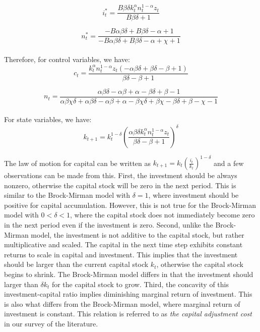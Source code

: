 \documentclass{article}
\begin{document}
\begin{equation}
    i_t^* = \frac{B\beta\delta k_t^\alpha n_t^{1 - \alpha}z_t}{B\beta\delta + 1}
\end{equation}

\begin{equation}
    n_t^* = \frac{-B\alpha\beta\delta + B\beta\delta - \alpha + 1}{-B\alpha\beta\delta + B\beta\delta - \alpha + \chi + 1}
\end{equation}\\

Therefore, for control variables, we have:\\
\begin{equation}
    c_t = \frac{k_t^\alpha n_t^{1-\alpha} z_t (-\alpha\beta\delta + \beta\delta - \beta + 1)}{\beta\delta - \beta + 1}
\end{equation}

\begin{equation}
    n_t = \frac{\alpha\beta\delta - \alpha\beta + \alpha - \beta\delta + \beta - 1}{\alpha\beta\chi\delta + \alpha\beta\delta - \alpha\beta + \alpha - \beta\chi\delta + \beta\chi - \beta\delta + \beta - \chi - 1}
\end{equation}\\

For state variables, we have:\\
\begin{equation}
    k_{t+1} = k_t^{1-\delta} \left(\frac{\alpha\beta\delta k_t^\alpha n_t^{1-\alpha} z_t}{\beta\delta - \beta + 1}\right)^\delta
\end{equation}


\hspace{1em} The law of motion for capital can be written as \(k_{t+1} = k_t(\frac{i_t}{k_t})^{1-\delta}\) and a few observations can be made from this.
First, the investment should be always nonzero, otherwise the capital stock will be zero in the next period.
This is similar to the Brock-Mirman model with \(\delta = 1\), where investment should be positive for capital accumulation.
However, this is not true for the Brock-Mirman model with \(0 < \delta < 1\), where the capital stock does not immediately become zero in the next period even if the investment is zero.
Second, unlike the Brock-Mirman model, the investment is not additive to the capital stock, but rather multiplicative and scaled.
The capital in the next time step exhibits constant returns to scale in capital and investment.
This implies that the investment should be larger than the current capital stock \(k_t\), otherwise the capital stock begins to shrink.
The Brock-Mirman model differs in that the investment should larger than \(\delta k_t\) for the capital stock to grow.
Third, the concavity of this investment-capital ratio implies diminishing marginal return of investment.
This is also what differs from the Brock-Mirman model, where marginal return of investment is constant.
This relation is referred to as \textit{the capital adjustment cost} in our survey of the literature.\\
\end{document}
